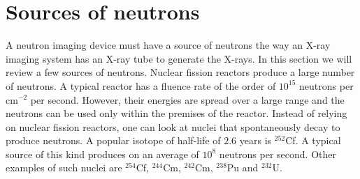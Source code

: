 \documentclass{article}
\numberwithin{equation}{section}
\begin{document}
\section{Sources of neutrons}\label{s3}
A neutron imaging device must have a source of neutrons the way an X-ray
imaging system has an X-ray tube to generate the X-rays. In this section we
will review a few sources of neutrons. Nuclear fission reactors produce a large
number of neutrons. A typical reactor has a fluence rate of the order of 
$10^{15}$ neutrons per $\text{cm}^{-2}$ per second. However, their energies are 
spread over a large range and the neutrons can be used only within the premises
of the reactor. Instead of relying on nuclear fission reactors, one can look
at nuclei that spontaneously decay to produce neutrons. A popular isotope of 
half-life of $2.6$ years is ${}^{252}$Cf. A typical source of this kind 
produces on an average of $10^{8}$ neutrons per second. Other examples of such
nuclei are ${}^{254}$Cf, ${}^{244}$Cm, ${}^{242}$Cm, ${}^{238}$Pu and 
${}^{232}$U.
\end{document}
